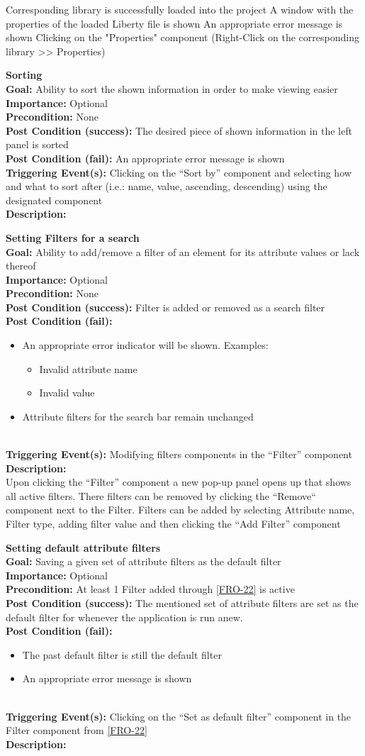 \documentclass[10pt,a4paper]{report}
\newcommand{\precondition}[1]{
    \textbf{Precondition: } #1 \leavevmode \\
}
\newcommand{\FRDescription}[8]{
    \textbf{#1} \leavevmode \\
    \textbf{Goal: } #2 \leavevmode \\
    \textbf{Importance: } #3 \leavevmode \\
    \precondition{#4}
    \textbf{Post Condition (success): } #5 \leavevmode \\
    \textbf{Post Condition (fail): } #6 \leavevmode \\
    \textbf{Triggering Event(s): } #7 \leavevmode \\
    \textbf{Description: } \leavevmode \\ 
    #8}
\newcommand{\FRODescription}[8]{
    \textbf{#1} \leavevmode \\
    \textbf{Goal: } #2 \leavevmode \\
    \textbf{Importance: } #3 \leavevmode \\
    \precondition{#4}
    \textbf{Post Condition (success): } #5 \leavevmode \\
    \textbf{Post Condition (fail): } #6 \leavevmode \\
    \textbf{Triggering Event(s): } #7 \leavevmode \\
    \textbf{Description: } \leavevmode \\
    #8}
\begin{document}
\begin{FRO}
    {Corresponding library is successfully loaded into the project}
    {A window with the properties of the loaded Liberty file is shown}
    {An appropriate error message is shown}
    {Clicking on the "Properties" component (Right-Click on the corresponding library  >> Properties)}
    \item \FRODescription{Sorting}
    {Ability to sort the shown information in order to make viewing easier}
    {Optional}
    {None}
    {The desired piece of shown information in the left panel is sorted}
    {An appropriate error message is shown}
    {Clicking on the “Sort by” component and selecting how and what to sort after (i.e.: name, value, ascending, descending) using the designated component}
    \item \FRDescription{Setting Filters for a search}
    {Ability to add/remove a filter of an element for its attribute values or lack thereof}
    {Optional}
    {None}
    {Filter is added or removed as a search filter}
    {\begin{itemize}
        \item An appropriate error indicator will be shown. Examples:
        \begin{itemize}
            \item Invalid attribute name
            \item Invalid value
        \end{itemize}
        \item Attribute filters for the search bar remain unchanged
    \end{itemize}}
    {Modifying filters components in the “Filter” component}
    {Upon clicking the “Filter” component a new pop-up panel opens up that shows all active filters. There filters can be removed by clicking the “Remove“ component next to the Filter. Filters can be added by selecting Attribute name, Filter type, adding filter value and then clicking the “Add Filter” component}
    \item \FRODescription{Setting default attribute filters}
    {Saving a given set of attribute filters as the default filter}
    {Optional}
    {At least 1 Filter added through \ref{FRO-22} is active}
    {The mentioned set of attribute filters are set as the default filter for whenever the application is run anew.}
    {\begin{itemize}
        \item The past default filter is still the default filter
        \item An appropriate error message is shown
    \end{itemize}}
    {Clicking on the “Set as default filter” component in the Filter component from \ref{FRO-22}}
\end{FRO}
\end{document}
